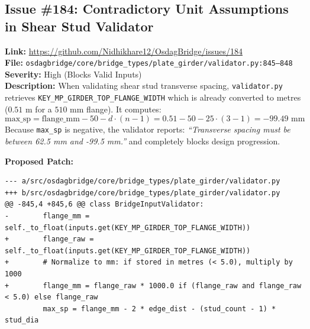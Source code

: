 \documentclass[11pt,a4paper]{article}
\begin{document}
\subsection{Issue \#184: Contradictory Unit Assumptions in Shear Stud Validator}
\textbf{Link:} \href{https://github.com/Nidhikhare12/OsdagBridge/issues/184}{https://github.com/Nidhikhare12/OsdagBridge/issues/184}\\
\textbf{File:} \texttt{osdagbridge/core/bridge\_types/plate\_girder/validator.py:845--848}\\
\textbf{Severity:} High (Blocks Valid Inputs)\\
\textbf{Description:} When validating shear stud transverse spacing, \texttt{validator.py} retrieves \texttt{KEY\_MP\_GIRDER\_TOP\_FLANGE\_WIDTH} which is already converted to metres ($0.51\text{ m}$ for a $510\text{ mm}$ flange). It computes:
\begin{equation}
\text{max\_sp} = \text{flange\_mm} - 50 - d \cdot (n - 1) = 0.51 - 50 - 25 \cdot (3 - 1) = -99.49\text{ mm}
\end{equation}
Because \texttt{max\_sp} is negative, the validator reports: \textit{``Transverse spacing must be between 62.5 mm and -99.5 mm.''} and completely blocks design progression.

\textbf{Proposed Patch:}
\begin{lstlisting}
--- a/src/osdagbridge/core/bridge_types/plate_girder/validator.py
+++ b/src/osdagbridge/core/bridge_types/plate_girder/validator.py
@@ -845,4 +845,6 @@ class BridgeInputValidator:
-        flange_mm = self._to_float(inputs.get(KEY_MP_GIRDER_TOP_FLANGE_WIDTH))
+        flange_raw = self._to_float(inputs.get(KEY_MP_GIRDER_TOP_FLANGE_WIDTH))
+        # Normalize to mm: if stored in metres (< 5.0), multiply by 1000
+        flange_mm = flange_raw * 1000.0 if (flange_raw and flange_raw < 5.0) else flange_raw
         max_sp = flange_mm - 2 * edge_dist - (stud_count - 1) * stud_dia
\end{lstlisting}

\end{document}
